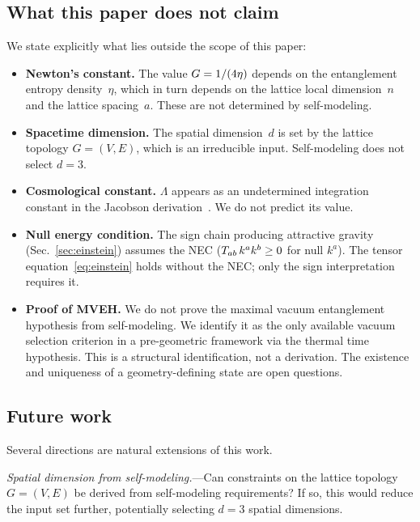 \subsection{What this paper does not claim}
\label{sec:not-claimed}

We state explicitly what lies outside the scope of this paper:
\begin{itemize}
\item \textbf{Newton's constant.}  The value $G = 1/(4\eta)$
  depends on the entanglement entropy density~$\eta$, which in turn
  depends on the lattice local dimension~$n$ and the lattice spacing~$a$.
  These are not determined by self-modeling.
\item \textbf{Spacetime dimension.}  The spatial dimension~$d$ is set by
  the lattice topology $G = (V, E)$, which is an irreducible input.
  Self-modeling does not select $d = 3$.
\item \textbf{Cosmological constant.}  $\Lambda$ appears as an
  undetermined integration constant in the Jacobson
  derivation~\cite{Jacobson2016, JacobsonSperanza2019}.  We do not
  predict its value.
\item \textbf{Null energy condition.}  The sign chain producing
  attractive gravity (Sec.~\ref{sec:einstein}) assumes the NEC
  ($T_{ab}\, k^a k^b \geq 0$ for null $k^a$).  The tensor
  equation~\eqref{eq:einstein} holds without the NEC; only the sign
  interpretation requires it.
\item \textbf{Proof of MVEH.}  We do not prove the maximal vacuum
  entanglement hypothesis from self-modeling.  We identify it as the
  only available vacuum selection criterion in a pre-geometric framework
  via the thermal time hypothesis.  This is a structural identification,
  not a derivation.  The existence and uniqueness of a geometry-defining
  state are open questions.
\end{itemize}

\subsection{Future work}
\label{sec:future}

Several directions are natural extensions of this work.

\emph{Spatial dimension from self-modeling.}---Can constraints on the
lattice topology $G = (V, E)$ be derived from self-modeling requirements?
If so, this would reduce the input set further, potentially selecting
$d = 3$ spatial dimensions.


